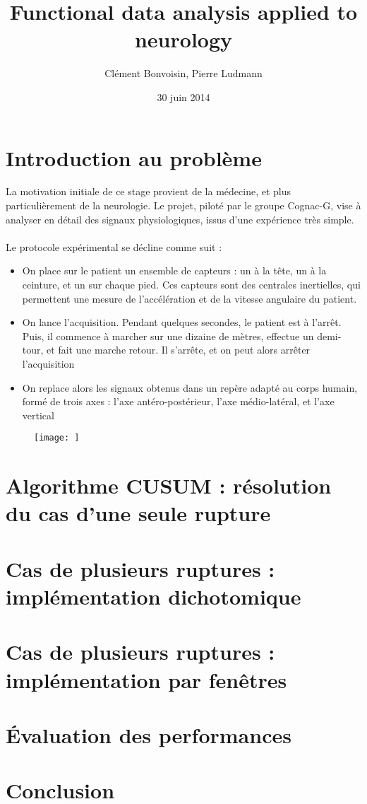 \documentclass[french]{report}
\begin{document}
	\title{Functional data analysis applied to neurology}
	\author{Clément Bonvoisin, Pierre Ludmann}
	\date{30 juin 2014}
	\maketitle
	\tableofcontents

	\chapter{Introduction au problème}
	La motivation initiale de ce stage provient de la médecine, et plus particulièrement de la neurologie. Le projet, piloté par le groupe Cognac-G, vise à analyser en détail des signaux physiologiques, issus d'une expérience très simple.
	\\ \\
	Le protocole expérimental se décline comme suit :
	\begin{itemize}
		\item On place sur le patient un ensemble de capteurs : un à la tête, un à la ceinture, et un sur chaque pied. Ces capteurs sont des centrales inertielles, qui permettent une mesure de l'accélération et de la vitesse angulaire du patient.
		\item On lance l'acquisition. Pendant quelques secondes, le patient est à l'arrêt. Puis, il commence à marcher sur une dizaine de mètres, effectue un demi-tour, et fait une marche retour. Il s'arrête, et on peut alors arrêter l'acquisition
		\item On replace alors les signaux obtenus dans un repère adapté au corps humain, formé de trois axes : l'axe antéro-postérieur, l'axe médio-latéral, et l'axe vertical
	\end{itemize}
	
	\begin{figure}[h]
		\texttt{[image: ]}
		\caption{}
		\label{}
	\end{figure}
	
	\chapter{Algorithme CUSUM : résolution du cas d'une seule rupture}
	
	\chapter{Cas de plusieurs ruptures : implémentation dichotomique}
	
	\chapter{Cas de plusieurs ruptures : implémentation par fenêtres}
	
	\chapter{Évaluation des performances}
	
	\chapter{Conclusion}
\end{document}
